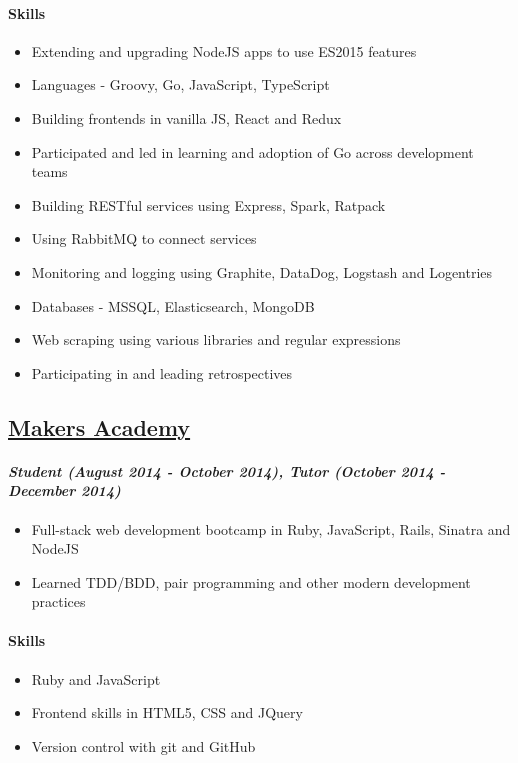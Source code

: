 \documentclass[11pt]{article}
\begin{document}
\paragraph*{Skills}
\label{sec:org8dc2b22}
\begin{itemize}
\item Extending and upgrading NodeJS apps to use ES2015 features
\item Languages - Groovy, Go, JavaScript, TypeScript
\item Building frontends in vanilla JS, React and Redux
\item Participated and led in learning and adoption of Go across development teams
\item Building RESTful services using Express, Spark, Ratpack
\item Using RabbitMQ to connect services
\item Monitoring and logging using Graphite, DataDog, Logstash and Logentries
\item Databases - MSSQL, Elasticsearch, MongoDB
\item Web scraping using various libraries and regular expressions
\item Participating in and leading retrospectives
\end{itemize}

\subsection*{\href{http://www.makersacademy.com/}{Makers Academy}}
\label{sec:org40d864a}
\paragraph*{\emph{Student (August 2014 - October 2014), Tutor (October 2014 - December 2014)}}
\label{sec:org480bdaa}
\begin{itemize}
\item Full-stack web development bootcamp in Ruby, JavaScript, Rails, Sinatra and NodeJS
\item Learned TDD/BDD, pair programming and other modern development practices
\end{itemize}

\paragraph*{Skills}
\label{sec:org249a5c5}
\begin{itemize}
\item Ruby and JavaScript
\item Frontend skills in HTML5, CSS and JQuery
\item Version control with git and GitHub
\end{itemize}
\end{document}
